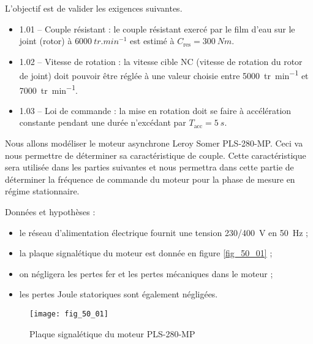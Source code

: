 \normaltrue \difficilefalse \tdifficilefalse
\correctionfalse

\setcounter{question}{0}
\ifcorrection
\else
{}
\fi

\ifprof
\else



\begin{obj}
L'objectif est de valider les exigences suivantes.
\begin{itemize}
\item 1.01 -- Couple résistant : le couple résistant exercé par le film d’eau sur le joint (rotor) à $\SI{6000}{tr.min^{-1}}$  est estimé à $C_{\text{res}} = \SI{300}{Nm}$.
\item 1.02 -- Vitesse de rotation : la vitesse cible NC (vitesse de rotation du rotor de joint) doit
pouvoir être réglée à une valeur choisie entre \SI{5000}{tr.min^{-1}} 
et \SI{7000}{tr.min^{-1}}.
\item 1.03 -- Loi de commande : la mise en rotation doit se faire à accélération constante pendant une durée n’excédant par $T_{\text{acc}} = \SI{5}{s}$.
\end{itemize}

Nous allons modéliser le moteur asynchrone Leroy Somer
PLS-280-MP. Ceci va nous permettre de déterminer sa caractéristique de couple. Cette
caractéristique sera utilisée dans les parties suivantes et nous permettra dans cette partie
de déterminer la fréquence de commande du moteur pour la phase de mesure en régime
stationnaire.
\end{obj}


Données et hypothèses :
\begin{itemize}
\item le réseau d’alimentation électrique fournit une tension 230/\SI{400}{V} en \SI{50}{Hz} ;
\item la plaque signalétique du moteur est donnée en figure \autoref{fig_50_01} ;
\item on négligera les pertes fer et les pertes mécaniques dans le moteur ;
\item les pertes Joule statoriques sont également négligées.
\end{itemize}

\begin{figure}[H]
\centering
\texttt{[image: fig\_50\_01]}
\caption{Plaque signalétique du moteur PLS-280-MP \label{fig_50_01}}
\end{figure}
\fi

